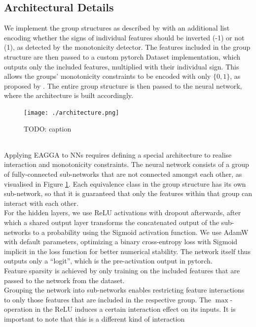 \documentclass[twoside,11pt]{article}
\begin{document}
\subsection{Architectural Details}
We implement the group structures as described by \citet[p. 541]{EAGGA} with an additional list encoding whether the signs of individual features should
be inverted (-1) or not (1), as detected by the monotonicity detector.
The features included in the group structure are then passed to a custom pytorch Dataset implementation, which outputs only the included features, multiplied with their
individual sign. This allows the groups' monotonicity constraints to be encoded with only $\{0,1\}$, as proposed by \citet[p. 543]{EAGGA}.
The entire group structure is then passed to the neural network, where the architecture is built accordingly.
\begin{figure}
  \centering
  \texttt{[image: ./architecture.png]}  %
  \caption{TODO: caption}
  \label{fig-nn-architecture}
\end{figure}
\\
Applying EAGGA to NNs requires defining a special architecture to realise interaction and monotonicity constraints.
The neural network consists of a group of fully-connected sub-networks that are not connected amongst each other, as visualised in Figure \ref{fig-nn-architecture}.
Each equivalence class in the group structure has its own sub-network, so that it is guaranteed that only the features within that group can interact with each other.
\\
For the hidden layers, we use ReLU activations with dropout afterwards, after which a shared output layer transforms the concatenated output of the sub-networks
to a probability using the Sigmoid activation function.
We use AdamW with default parameters, optimizing a binary cross-entropy loss with Sigmoid implicit in the loss function for better numerical stability. The network
itself thus outputs only a ``logit'', which is the pre-activation output in pytorch.
\\
Feature sparsity is achieved by only training on the included features that are passed to the network from the dataset.
\\
Grouping the network into sub-networks enables restricting feature interactions to only those features that are included in the respective group.
The $\max$-operation in the ReLU induces a certain interaction effect on its inputs. It is important to note that this is a different kind of interaction
\end{document}
